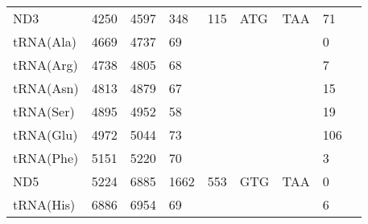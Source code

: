 \documentclass[../DISSERTACAO_MAIN.tex]{subfiles}
\begin{document}
\begin{longtable}{llllllllllllllllllllll}
			ND3          & \multicolumn{2}{l}{4250}    & \multicolumn{2}{l}{4597}    & \multicolumn{2}{l}{348}         & \multicolumn{3}{l}{115}                       & \multicolumn{3}{l}{ATG}   & \multicolumn{3}{l}{TAA}     & \multicolumn{3}{l}{71}          & \multicolumn{3}{l}{}         \\
			tRNA(Ala)    & \multicolumn{2}{l}{4669}    & \multicolumn{2}{l}{4737}    & \multicolumn{2}{l}{69}          & \multicolumn{3}{l}{}                          & \multicolumn{3}{l}{}      & \multicolumn{3}{l}{}        & \multicolumn{3}{l}{0}           & \multicolumn{3}{l}{}         \\
			tRNA(Arg)    & \multicolumn{2}{l}{4738}    & \multicolumn{2}{l}{4805}    & \multicolumn{2}{l}{68}          & \multicolumn{3}{l}{}                          & \multicolumn{3}{l}{}      & \multicolumn{3}{l}{}        & \multicolumn{3}{l}{7}           & \multicolumn{3}{l}{}         \\
			tRNA(Asn)    & \multicolumn{2}{l}{4813}    & \multicolumn{2}{l}{4879}    & \multicolumn{2}{l}{67}          & \multicolumn{3}{l}{}                          & \multicolumn{3}{l}{}      & \multicolumn{3}{l}{}        & \multicolumn{3}{l}{15}          & \multicolumn{3}{l}{}         \\
			tRNA(Ser)    & \multicolumn{2}{l}{4895}    & \multicolumn{2}{l}{4952}    & \multicolumn{2}{l}{58}          & \multicolumn{3}{l}{}                          & \multicolumn{3}{l}{}      & \multicolumn{3}{l}{}        & \multicolumn{3}{l}{19}          & \multicolumn{3}{l}{}         \\
			tRNA(Glu)    & \multicolumn{2}{l}{4972}    & \multicolumn{2}{l}{5044}    & \multicolumn{2}{l}{73}          & \multicolumn{3}{l}{}                          & \multicolumn{3}{l}{}      & \multicolumn{3}{l}{}        & \multicolumn{3}{l}{106}         & \multicolumn{3}{l}{}         \\
			tRNA(Phe)    & \multicolumn{2}{l}{5151}    & \multicolumn{2}{l}{5220}    & \multicolumn{2}{l}{70}          & \multicolumn{3}{l}{}                          & \multicolumn{3}{l}{}      & \multicolumn{3}{l}{}        & \multicolumn{3}{l}{3}           & \multicolumn{3}{l}{}         \\
			ND5          & \multicolumn{2}{l}{5224}    & \multicolumn{2}{l}{6885}    & \multicolumn{2}{l}{1662}        & \multicolumn{3}{l}{553}                       & \multicolumn{3}{l}{GTG}   & \multicolumn{3}{l}{TAA}     & \multicolumn{3}{l}{0}           & \multicolumn{3}{l}{}         \\
			tRNA(His)    & \multicolumn{2}{l}{6886}    & \multicolumn{2}{l}{6954}    & \multicolumn{2}{l}{69}          & \multicolumn{3}{l}{}                          & \multicolumn{3}{l}{}      & \multicolumn{3}{l}{}        & \multicolumn{3}{l}{6}           & \multicolumn{3}{l}{}         \\

\end{longtable}
\end{document}
